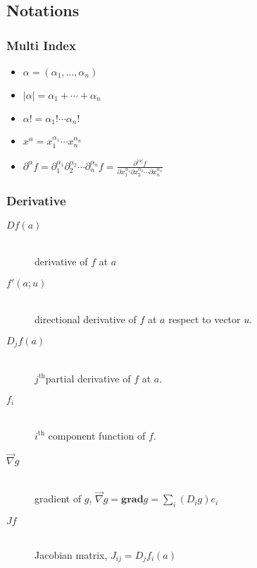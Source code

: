 \subsection{Notations}

\subsubsection{Multi Index}
\label{multiindex}
\begin{itemize}
\item $\alpha = (\alpha_1, \ldots, \alpha_n)$
\item $|\alpha| = \alpha_1 + \cdots + \alpha_n$
\item $\alpha! = \alpha_1! \cdots \alpha_n!$
\item $x^\alpha = x_1^{\alpha_1} \cdots x_n^{\alpha_n}$
\item $\partial^\alpha f = \partial_1^{\alpha_1}\partial_2^{\alpha_2} \cdots \partial_n^{\alpha_n} f = \frac{\partial^{|\alpha|}f}{\partial x_1^{\alpha_1} \partial x_2^{\alpha_2} \cdots \partial x_n^{\alpha_n}}$
\end{itemize}

\subsubsection{Derivative}

\begin{description}
	\item[$Df(a)$] \hfill \\
		derivative of $f$ at $a$

	\item[$f'(a;u)$] \hfill \\
		directional derivative of $f$ at $a$ respect to vector $u$.

	\item[$D_jf(a)$] \hfill \\
		$j^\textrm{th}$partial derivative of $f$ at $a$.

	\item[$f_i$] \hfill \\
		$i^\textrm{th}$ component function of $f$.

	\item[$\vec\nabla g$] \hfill \\
		gradient of $g$, $\vec\nabla g = \mathbf{grad} g = \sum_i (D_ig)e_i$

	\item[$J f$] \hfill \\
		Jacobian matrix, $J_{ij} = D_jf_i(a)$
\end{description}


